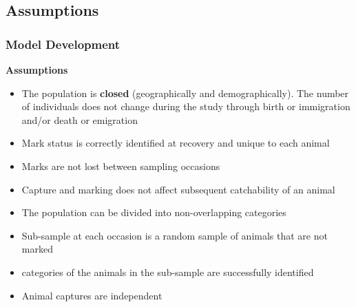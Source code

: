\documentclass{beamer}
\begin{document}
\subsection{Assumptions}
\begin{frame} \frametitle{Model Development}
\textbf{{\footnotesize Assumptions}}
{\footnotesize 
\begin{itemize}
 \item The population is \textbf{closed} (geographically and demographically). The number of individuals does not change
 during the study through birth or immigration and/or death or emigration
 \item Mark status is correctly identified at recovery and unique to each animal
 \item Marks are not lost between sampling occasions
 \item Capture and marking does not affect subsequent catchability of an animal
 \item The population can be  divided into non-overlapping categories
 \item Sub-sample at each occasion is a random sample of animals that are not marked
 \item categories of the animals in the sub-sample are successfully identified
 \item Animal captures are independent
 \end{itemize}
}
\end{frame}

\end{document}
